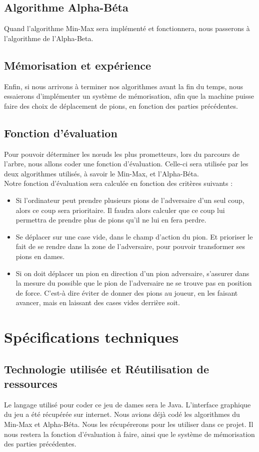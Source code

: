 \documentclass[a4paper, title page, 12pt]{report}
\begin{document}
	\section{Algorithme Alpha-Béta}
	Quand l'algorithme Min-Max sera implémenté et fonctionnera, nous passerons à l'algorithme de l'Alpha-Beta.\\
	
	\section{Mémorisation et expérience}
	Enfin, si nous arrivons à terminer nos algorithmes avant la fin du temps, nous essaierons d'implémenter un système de mémorisation, afin que la machine puisse faire des choix de déplacement de pions, en fonction des parties précédentes.
	
	\section{Fonction d'évaluation}
	Pour pouvoir déterminer les nœuds les plus prometteurs, lors du parcours de l'arbre, nous allons coder une fonction d'évaluation. Celle-ci sera utilisée par les deux algorithmes utilisés, à savoir le Min-Max, et l'Alpha-Béta.\\
	
	Notre fonction d'évaluation sera calculée en fonction des critères suivants : 
 
	\begin{itemize}
		\item Si l'ordinateur peut prendre plusieurs pions de l'adversaire d'un seul coup, alors ce coup sera prioritaire. Il faudra alors calculer que ce coup lui permettra de prendre plus de pions qu'il ne lui en fera perdre.
		
		\item Se déplacer sur une case vide, dans le champ d'action du pion. Et prioriser le fait de se rendre dans la zone de l'adversaire, pour pouvoir transformer ses pions en dames. 
		
		\item Si on doit déplacer un pion en direction d'un pion adversaire, s'assurer dans la mesure du possible que le pion de l'adversaire ne se trouve pas en position de force. C'est-à dire éviter de donner des pions au joueur, en les faisant avancer, mais en laissant des cases vides derrière soit.\\
\end{itemize}
	\chapter{Spécifications techniques}
	\section{Technologie utilisée et Réutilisation de ressources}
Le langage utilisé pour coder ce jeu de dames sera le Java. L'interface graphique du jeu a été récupérée sur internet. Nous avions déjà codé les algorithmes du Min-Max et Alpha-Béta. Nous les récupérerons pour les utiliser dans ce projet. Il nous restera la fonction d’évaluation à faire, ainsi que le système de mémorisation des parties précédentes.
\end{document}
